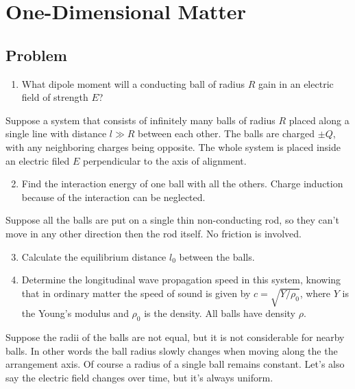 \section*{One-Dimensional Matter}

\subsection*{Problem}

\renewcommand{\labelenumii}{\theenumii}
\renewcommand{\theenumii}{\theenumi.\arabic{enumii}.}

\begin{enumerate}
    \item What dipole moment will a conducting ball of radius $R$ gain
        in an electric field of strength $E$?
\end{enumerate}

Suppose a system that consists of infinitely many balls of radius $R$
placed along a single line with distance $l \gg R$ between each other.
The balls are charged $\pm Q$, with any neighboring charges being opposite.
The whole system is placed inside an electric filed $E$
perpendicular to the axis of alignment.

\begin{enumerate}
    \setcounter{enumi}{1}
    \item Find the interaction energy of one ball with all the others.
    Charge induction because of the interaction can be neglected.
\end{enumerate}

Suppose all the balls are put on a single thin non-conducting rod,
so they can't move in any other direction then the rod itself.
No friction is involved.

\begin{enumerate}
    \setcounter{enumi}{2}
    \item Calculate the equilibrium distance $l_0$ between the balls.
    \item Determine the longitudinal wave propagation speed in this system,
    knowing that in ordinary matter the speed of sound is given by $c = \sqrt{Y/\rho_0}$,
    where $Y$ is the Young's modulus and $\rho_0$ is the density.
    All balls have density $\rho$.
\end{enumerate}

Suppose the radii of the balls are not equal,
but it is not considerable for nearby balls.
In other words the ball radius slowly changes
when moving along the the arrangement axis.
Of course a radius of a single ball remains constant.
Let's also say the electric field changes over time,
but it's always uniform.

